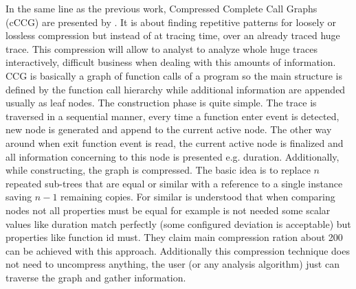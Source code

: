\documentclass[12pt]{report}
\begin{document}
In the same line as the previous work, Compressed Complete Call Graphs (cCCG) are 
presented by \cite{knupfer2005construction}. It is about finding repetitive 
patterns for loosely or lossless compression but instead of at tracing time, 
over an already traced huge trace. 
This compression will allow to analyst to analyze whole huge traces 
interactively, difficult business when dealing with this amounts of information. 
CCG is basically a graph of function calls of a program so the main structure is
defined by the function call hierarchy while additional information are appended
usually as leaf nodes. The construction phase is quite simple. The trace is
traversed in a sequential manner, every time a function enter event is detected,
new node is generated and append to the current active node. The
other way around when exit function event is read, the current active node is
finalized and all information concerning to this node is presented e.g.
duration. Additionally, while constructing, the graph is compressed. The basic 
idea is to replace $n$ repeated sub-trees that are equal or similar with a 
reference to a single instance saving $n-1$ remaining copies. For similar is
understood that when comparing nodes not all properties must be equal for
example is not needed some scalar values like duration match perfectly (some
configured deviation is acceptable) but properties like function id must. They
claim main compression ration about 200 can be achieved with this approach.
Additionally this compression technique does not need to uncompress anything, the
user (or any analysis algorithm) just can traverse the graph and gather
information.
\end{document}
